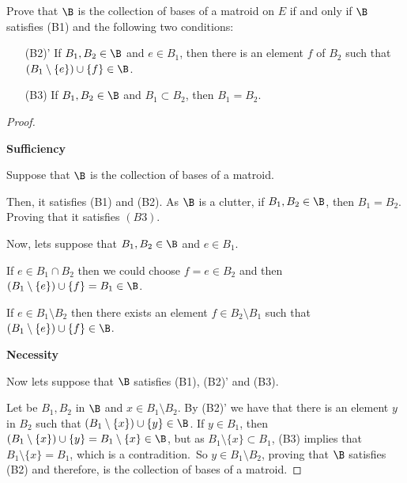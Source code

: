 \prob
{
    Prove that $\B$ is the collection of bases of a matroid on 
    $E$ if and only if $\B$ satisfies (B1) and the following two conditions:
    
    \begin{itemize}
        \item[(B2)'] If $B_1, B_2 \in \B$ and $e \in B_1$, then there is an element $f$ of
                        $B_2$ such that $(B_1 \setminus \{e\}) \cup \{f\} \in \B$.
                        
        \item[(B3)] If $B_1, B_2 \in \B$ and $B_1 \subset B_2$, then $B_1 = B_2$.
    \end{itemize}
}

\begin{proof}
    $\,$\pn
    
    \textbf{Sufficiency}\pn
        
    Suppose that $\B$ is the collection of bases of a matroid.\pn
    
    Then, it satisfies (B1) and (B2). As $\B$ is a clutter, if $B_1, B_2 \in \B$, then
    $B_1 = B_2$. Proving that it satisfies $(B3)$.\pn 
    
    Now, lets suppose that $B_1, B_2 \in \B$ and $e \in B_1$.\pn 
    
    If $e \in B_1 \cap B_2$ then we could choose $f = e \in B_2$ and then 
    $(B_1 \setminus \{e\}) \cup \{f\} = B_1 \in \B$.\pn
    
    If $e \in B_1 \setminus B_2$ then there exists an element $f \in B_2 \setminus B_1$ such that
    $(B_1 \setminus \{e\}) \cup \{ f \} \in \B$.\pn
    
    \textbf{Necessity}\pn
    
    Now lets suppose that $\B$ satisfies (B1), (B2)' and (B3).\pn
    
    Let be $B_1, B_2$ in $\B$ and $x \in B_1 \setminus B_2$. By (B2)' we have that there is 
    an element $y$ in $B_2$ such that $(B_1 \setminus \{x\}) \cup \{y\} \in \B$. If
    $y \in B_1$, then $(B_1 \setminus \{x\}) \cup \{y\} = B_1 \setminus \{x\} \in \B$, but as
    $B_1 \setminus \{x\} \subset B_1$, (B3) implies that $B_1 \setminus \{x\} = B_1$, which is a contradition.\
    So $y \in B_1 \setminus B_2$, proving that $\B$ satisfies (B2) and therefore, is the
    collection of bases of a matroid.
\end{proof}